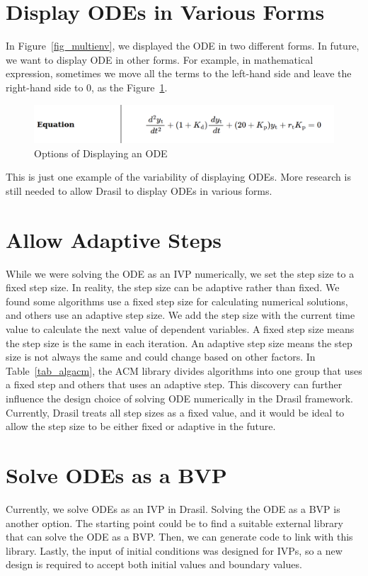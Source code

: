 \section{Display ODEs in Various Forms}
In Figure~\ref{fig_multienv}, we displayed the ODE in two different forms. In future, we want to display ODE in other forms. For example, in mathematical expression, sometimes we move all the terms to the left-hand side and leave the right-hand side to 0, as the Figure~\ref{fig_odevariousform}.
\begin{figure}[ht]
\centering	
\includegraphics[width=1\textwidth]{figures/ODEVariousForm.png}
\caption{Options of Displaying an ODE}
\label{fig_odevariousform}
\end{figure}
This is just one example of the variability of displaying ODEs. More research is still needed to allow Drasil to display ODEs in various forms.

\section{Allow Adaptive Steps}
While we were solving the ODE as an IVP numerically, we set the step size to a fixed step size. In reality, the step size can be adaptive rather than fixed. We found some algorithms use a fixed step size for calculating numerical solutions, and others use an adaptive step size. We add the step size with the current time value to calculate the next value of dependent variables. A fixed step size means the step size is the same in each iteration. An adaptive step size means the step size is not always the same and could change based on other factors. In Table~\ref{tab_algacm}, the ACM library divides algorithms into one group that uses a fixed step and others that uses an adaptive step. This discovery can further influence the design choice of solving ODE numerically in the Drasil framework. Currently, Drasil treats all step sizes as a fixed value, and it would be ideal to allow the step size to be either fixed or adaptive in the future.

\section{Solve ODEs as a BVP}
Currently, we solve ODEs as an IVP in Drasil. Solving the ODE as a BVP is another option. The starting point could be to find a suitable external library that can solve the ODE as a BVP. Then, we can generate code to link with this library. Lastly, the input of initial conditions was designed for IVPs, so a new design is required to accept both initial values and boundary values.

